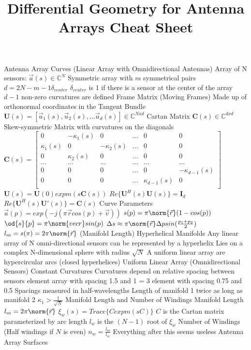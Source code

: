 \documentclass[14pt]{extarticle}
\title{Differential Geometry for Antenna Arrays Cheat Sheet}
\begin{document}
	\maketitle
	\begin{outline}
		\1	Antenna Array Curves (Linear Array with Omnidirectional Antennas)
			\2	Array of N sensors: $\vec{a}(s) \in \mathbb{C}^N$
				\3	Symmetric array with $m$ symmetrical pairs
				\3	$d = 2N - m - 1\delta_{center}$
				\3	$\delta_{center}$ is 1 if there is a sensor at the center of the array
				\3	$d-1$ non-zero curvatures are defined 
			\2	Frame Matrix (Moving Frames)
				\3	Made up of orthonormal coordinates in the Tangent Bundle
				\3	$\bm{U}(s) = [\vec{u}_1(s), \vec{u}_2(s),...\vec{u}_d(s)] \in \mathbb{C}^{N x d}$	
				\3	Cartan Matrix $\bm{C}(s) \in \mathbb{C}^{d x d}$
					\4	Skew-symmetric Matrix with curvatures on the diagonals	
					\4	$\bm{C}(s) = \begin{bmatrix}
								0 & -\kappa_1(s) & 0 & ... & 0 & 0 \\
								\kappa_1(s) & 0 & -\kappa_2(s) & ... & 0 & 0 \\
								0 & \kappa_2(s) & 0 & ... & 0 & 0 \\
								... & ... & ... & ... & ... & ... \\
								0 & 0 & 0 & ... & 0 & -\kappa_{d-1}(s) \\
								0 & 0 & 0 & ... & \kappa_{d-1}(s) & 0 \\ 
							 \end{bmatrix}$
				\3	$\bm{U}(s) = \bm{U}(0) expm(s \bm{C}(s))$
				\3	$Re\{\bm{U}^H(s)\bm{U}(s)\} = \bm{I}_d$
				\3	$Re\{\bm{U}^H(s)\bm{U}'(s)\} = \bm{C}(s)$ 	
			\2	Curve Parameters
				\3	$\vec{a}(p) = exp(-j(\pi \vec{r}cos(p) + \vec{v}))$
				\3	$s(p) = \pi \norm{\vec{r}}(1 - cos(p))$
				\3	$\od{s}{p} = \pi \norm{vec{r}}sin(p)$
				\3	$\Delta s \approx \pi \norm{\vec{r}}\Delta p sin(\frac{p_1 + p_2}{2})$
				\3	$l_m = s(\pi) = 2\pi \norm{\vec{r}}$ (Manifold Length)
			\2	Hyperhelical Manifolds
				\3	Any linear array of N omni-directional sensors can be represented by a hyperhelix
				\3	Lies on a complex N-dimensional sphere with radius $\sqrt{N}$
				\3	A uniform linear array are hypercircular arcs (closed hyperhelices)
			\2	Uniform Linear Array (Omnidirectional Sensors)
				\3	Constant Curvatures
				\3	Curvatures depend on relative spacing between sensors
					 element array with spacing 1.5 and 1 = 3 element with spacing 0.75 and 0.5
					\4	Spacings measured in half-wavelengths
					\4	Length of manifold 1 twice as long as manifold 2
				\3	$\kappa_1 > \frac{1}{\sqrt{N}}$
			\2	Manifold Length and Number of Windings
				\3	Manifold Length $l_m = 2\pi \norm{\vec{r}}$ 
				\3	$\xi_w(s) = Trace\{C expm(s C)\}$
					\4	$C$ is the Cartan matrix parameterized by arc length
					\4	$l_w$ is the $(N-1)$ root of $\xi_w$ 
				\3	Number of Windings (Half windings if $N$ is even)
					\4	$n_w = \frac{l_m}{l_w}$
			\2	Everything after this seems useless	
	\1	Antenna Array Surfaces %
	\end{outline}
\end{document}
